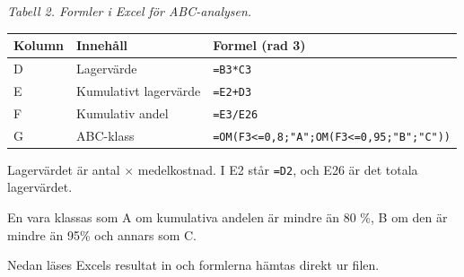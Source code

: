\documentclass[11pt]{article}
\begin{document}
\emph{Tabell 2. Formler i Excel för ABC-analysen.}

{\def\LTcaptype{none} %
\begin{longtable}[]{@{}lll@{}}
\toprule\noalign{}
Kolumn & Innehåll & Formel (rad 3) \\
\midrule\noalign{}
\endhead
\bottomrule\noalign{}
\endlastfoot
D & Lagervärde & \texttt{=B3*C3} \\
E & Kumulativt lagervärde & \texttt{=E2+D3} \\
F & Kumulativ andel & \texttt{=E3/E26} \\
G & ABC-klass &
\texttt{=OM(F3\textless{}=0,8;"A";OM(F3\textless{}=0,95;"B";"C"))} \\
\end{longtable}
}

Lagervärdet är antal \(\times\) medelkostnad. I E2 står \texttt{=D2},
och E26 är det totala lagervärdet.

En vara klassas som A om kumulativa andelen är mindre än 80 \%, B om den
är mindre än 95\% och annars som C.

Nedan läses Excels resultat in och formlerna hämtas direkt ur filen.
\end{document}
